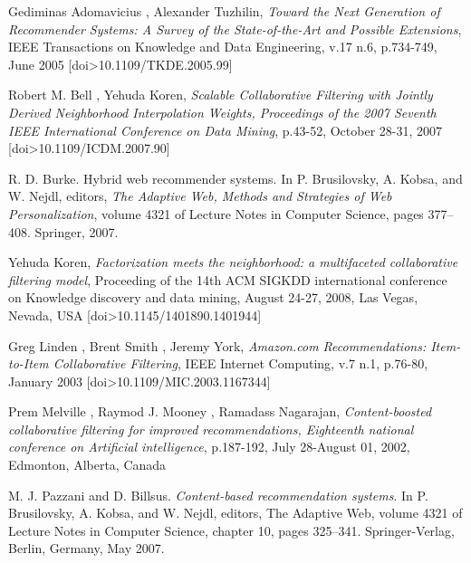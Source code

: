 \documentclass[11pt,letterpaper]{article}
\begin{document}





\newpage
\newpage
\begin{thebibliography}{13}
   Gediminas Adomavicius , Alexander Tuzhilin, \textit{Toward the Next Generation of Recommender Systems: A Survey of the State-of-the-Art and Possible Extensions}, IEEE Transactions on Knowledge and Data Engineering, v.17 n.6, p.734-749, June 2005  [doi>10.1109/TKDE.2005.99]

   Robert M. Bell , Yehuda Koren, \textit{Scalable Collaborative Filtering with Jointly Derived Neighborhood Interpolation Weights, Proceedings of the 2007 Seventh IEEE International Conference on Data Mining}, p.43-52, October 28-31, 2007  [doi>10.1109/ICDM.2007.90]

   R. D. Burke. Hybrid web recommender systems. In P. Brusilovsky, A. Kobsa, and W. Nejdl, editors, \textit{The Adaptive Web, Methods and Strategies of Web Personalization}, volume 4321 of Lecture Notes in Computer Science, pages 377--408. Springer, 2007.

   Yehuda Koren, \textit{Factorization meets the neighborhood: a multifaceted collaborative filtering model}, Proceeding of the 14th ACM SIGKDD international conference on Knowledge discovery and data mining, August 24-27, 2008, Las Vegas, Nevada, USA  [doi>10.1145/1401890.1401944]

   Greg Linden , Brent Smith , Jeremy York, \textit{Amazon.com Recommendations: Item-to-Item Collaborative Filtering}, IEEE Internet Computing, v.7 n.1, p.76-80, January 2003  [doi>10.1109/MIC.2003.1167344]

   Prem Melville , Raymod J. Mooney , Ramadass Nagarajan, \textit{Content-boosted collaborative filtering for improved recommendations, Eighteenth national conference on Artificial intelligence}, p.187-192, July 28-August 01, 2002, Edmonton, Alberta, Canada

   M. J. Pazzani and D. Billsus. \textit{Content-based recommendation systems}. In P. Brusilovsky, A. Kobsa, and W. Nejdl, editors, The Adaptive Web, volume 4321 of Lecture Notes in Computer Science, chapter 10, pages 325--341. Springer-Verlag, Berlin, Germany, May 2007.


\end{thebibliography}
\end{document}
